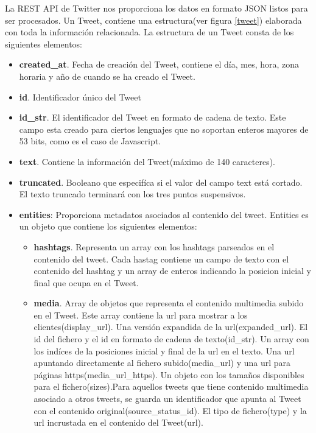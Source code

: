 La REST API de Twitter nos proporciona los datos en formato JSON listos para ser procesados. Un Tweet, contiene una estructura(ver figura \ref{tweet}) elaborada con toda la información relacionada. La estructura de un Tweet consta de los siguientes elementos:

\begin{itemize}

\item \textbf{created\_at}. Fecha de creación del Tweet, contiene el día, mes, hora, zona horaria y año de cuando se ha creado el Tweet.
\item \textbf{id}. Identificador único del Tweet
\item \textbf{id\_str}. El identificador del Tweet en formato de cadena de texto. Este campo esta creado para ciertos lenguajes que no soportan enteros mayores de 53 bits, como es el caso de Javascript.
\item \textbf{text}. Contiene la información del Tweet(máximo de 140 caracteres).
\item \textbf{truncated}. Booleano que especifíca si el valor del campo text está cortado. El texto truncado terminará con los tres puntos suspensivos.
\item \textbf{entities}: Proporciona metadatos asociados al contenido del tweet. Entities es un objeto que contiene los siguientes elementos:

\begin{itemize}

\item \textbf{hashtags}. Representa un array con los hashtags parseados en el contenido del tweet. Cada hastag contiene un campo de texto con el contenido del hashtag y un array de enteros indicando la posicion inicial y final que ocupa en el Tweet.

\item \textbf{media}. Array de objetos que representa el contenido multimedia subido en el Tweet. Este array contiene la url para mostrar a los clientes(display\_url). Una versión expandida de la url(expanded\_url). El id del fichero y el id en formato de cadena de texto(id\_str). Un array con los indíces de la posiciones inicial y final de la url en el texto. Una url apuntando directamente al fichero subido(media\_url) y una url para páginas https(media\_url\_https). Un objeto con los tamaños disponibles para el fichero(sizes).Para aquellos tweets que tiene contenido multimedia asociado a otros tweets, se guarda un identificador que apunta al Tweet con el contenido original(source\_status\_id). El tipo de fichero(type) y la url incrustada en el contenido del Tweet(url).


\end{itemize}
\end{itemize}
